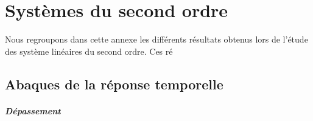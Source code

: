 \chapter{Systèmes du second ordre\label{annexe-2nd}}
Nous regroupons dans cette annexe les différents résultats obtenus lors de 
l'étude des système linéaires du second ordre. Ces ré
\newpage
\section{Abaques de la réponse temporelle}

\paragraph{Dépassement}
\begin{figure}[!hbt]
    \centering
    
\end{figure}
